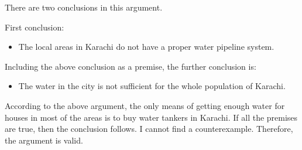 \documentclass{article}
\begin{document}
There are two conclusions in this argument.

First conclusion:
\begin{itemize}
\item The local areas in Karachi do not have a proper water pipeline system.
\end{itemize}

Including the above conclusion as a premise, the further conclusion is:
\begin{itemize}
\item The water in the city is not sufficient for the whole population of Karachi.
\end{itemize}

According to the above argument, the only means of getting enough water for houses in most of the areas is to buy water tankers in Karachi. If all the premises are true, then the conclusion follows. I cannot find a counterexample. Therefore, the argument is valid.
\end{document}
